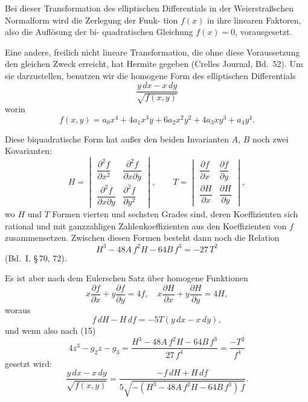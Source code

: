 \documentclass[12pt,a4paper]{book}
\theoremstyle{definition}
\begin{document}
Bei dieser Transformation des elliptischen Differentials in der
Weierstra\ss schen Normalform wird die Zerlegung der Funk-
tion $f(x)$ in ihre linearen Faktoren, also die Aufl\"osung der bi-
quadratischen Gleichung $f(x) = 0$, vorausgesetzt.

Eine andere, freilich nicht lineare Transformation, die ohne diese Voraussetzung
den gleichen Zweck erreicht, hat Hermite gegeben (Crelles
Journal, Bd.~52). Um sie darzustellen, benutzen wir die homogene
Form des elliptischen Differentials
\begin{equation}
\frac{y\,dx - x\,dy}{\sqrt{f(x,y)}} \tag{12}
\end{equation}
worin
\begin{equation}
f(x,y) = a_0 x^4 + 4a_1 x^3 y + 6a_2 x^2 y^2 + 4a_3 x y^3 + a_4 y^4. \tag{13}
\end{equation}

Diese biquadratische Form hat au\ss er den beiden Invarianten
$A$, $B$ noch zwei Kovarianten:
\begin{equation}
H = \begin{vmatrix}
\dfrac{\partial^2 f}{\partial x^2} & \dfrac{\partial^2 f}{\partial x \partial y}\\[1em]
\dfrac{\partial^2 f}{\partial x \partial y} & \dfrac{\partial^2 f}{\partial y^2}
\end{vmatrix}, \qquad
T = \begin{vmatrix}
\dfrac{\partial f}{\partial x} & \dfrac{\partial f}{\partial y}\\[1em]
\dfrac{\partial H}{\partial x} & \dfrac{\partial H}{\partial y}
\end{vmatrix}, \tag{14}
\end{equation}
wo $H$ und $T$ Formen vierten und sechsten Grades sind, deren
Koeffizienten sich rational und mit ganzzahligen Zahlenkoeffizienten
aus den Koeffizienten von $f$ zusammensetzen. Zwischen diesen
Formen besteht dann noch die Relation
\begin{equation}
H^3 - 48A\,f^2 H - 64B\,f^3 = -27\,T^2 \tag{15}
\end{equation}
(Bd.~I, \S\,70, 72).

Es ist aber nach dem Eulerschen Satz \"uber homogene
Funktionen
\[
x\frac{\partial f}{\partial x} + y\frac{\partial f}{\partial y} = 4f, \quad
x\frac{\partial H}{\partial x} + y\frac{\partial H}{\partial y} = 4H,
\]
woraus
\[
f\,dH - H\,df = -5T(y\,dx - x\,dy),
\]
und wenn also nach (15)
\begin{equation}
4z^3 - g_2 z - g_3 = \frac{H^3 - 48A\,f^2 H - 64B\,f^3}{27\,f^4} = \frac{-T^2}{f^4} \tag{16}
\end{equation}
gesetzt wird:
\[
\frac{y\,dx - x\,dy}{\sqrt{f(x,y)}} = \frac{-f\,dH + H\,df}{5\sqrt{-(H^3 - 48A\,f^2 H - 64B\,f^3)\,f}}.
\]
\end{document}
